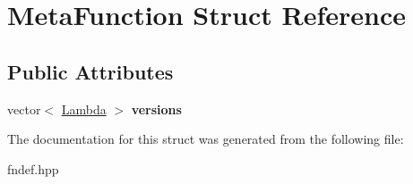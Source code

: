\hypertarget{structMetaFunction}{
\section{MetaFunction Struct Reference}
\label{structMetaFunction}
}
\subsection*{Public Attributes}
\begin{DoxyCompactItemize}
\item 
\hypertarget{structMetaFunction_a66e5f923e15ce7d66b371a2387f8c94c}{
vector$<$ \hyperlink{structLambda}{Lambda} $>$ {\bfseries versions}}
\label{structMetaFunction_a66e5f923e15ce7d66b371a2387f8c94c}

\end{DoxyCompactItemize}


The documentation for this struct was generated from the following file:\begin{DoxyCompactItemize}
\item 
fndef.hpp\end{DoxyCompactItemize}
